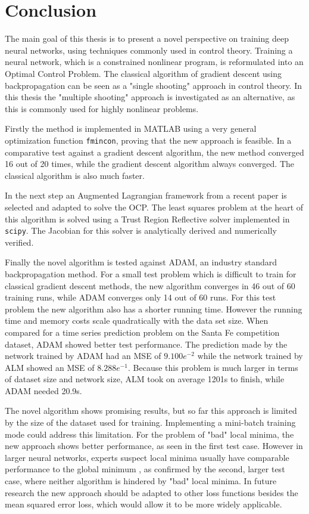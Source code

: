 \chapter{Conclusion}
\label{cha:conclusion}
The main goal of this thesis is to present a novel perspective on training deep neural networks, using techniques commonly used in control theory. Training a neural network, which is a constrained nonlinear program, is reformulated into an Optimal Control Problem. The classical algorithm of gradient descent using backpropagation can be seen as a "single shooting" approach in control theory. In this thesis the "multiple shooting" approach is investigated as an alternative, as this is commonly used for highly nonlinear problems.

Firstly the method is implemented in MATLAB using a very general optimization function \texttt{fmincon}, proving that the new approach is feasible. In a comparative test against a gradient descent algorithm, the new method converged 16 out of 20 times, while the gradient descent algorithm always converged. The classical algorithm is also much faster.

In the next step an Augmented Lagrangian framework from a recent paper is selected and adapted to solve the OCP. The least squares problem at the heart of this algorithm is solved using a Trust Region Reflective solver implemented in \texttt{scipy}. The Jacobian for this solver is analytically derived and numerically verified.

Finally the novel algorithm is tested against ADAM, an industry standard backpropagation method. For a small test problem which is difficult to train for classical gradient descent methods, the new algorithm converges in 46 out of 60 training runs, while ADAM converges only 14 out of 60 runs. For this test problem the new algorithm also has a shorter running time. However the running time and memory costs scale quadratically with the data set size. When compared for a time series prediction problem on the Santa Fe competition dataset, ADAM showed better test performance. The prediction made by the network trained by ADAM had an MSE of $9.100e^{-2}$ while the network trained by ALM showed an MSE of $8.288e^{-1}$. Because this problem is much larger in terms of dataset size and network size, ALM took on average 1201s to finish, while ADAM needed 20.9s.

The novel algorithm shows promising results, but so far this approach is limited by the size of the dataset used for training. Implementing a mini-batch training mode could address this limitation. For the problem of "bad" local minima, the new approach shows better performance, as seen in the first test case. However in larger neural networks, experts suspect local minima usually have comparable performance to the global minimum \cite{Goodfellow-et-al-2016}, as confirmed by the second, larger test case, where neither algorithm is hindered by "bad" local minima. In future research the new approach should be adapted to other loss functions besides the mean squared error loss, which would allow it to be more widely applicable.

